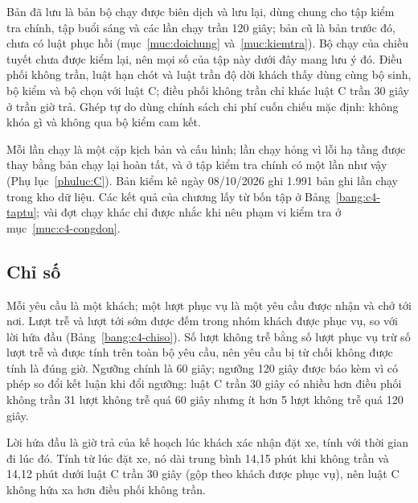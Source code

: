 Bản đã lưu là bản bộ chạy được biên dịch và lưu lại, dùng chung cho tập kiểm tra chính, tập buổi sáng và các lần
chạy trần 120 giây; bản cũ là bản trước đó, chưa có luật phục hồi (mục~\ref{muc:doichung} và~\ref{muc:kiemtra}). Bộ
chạy của chiều tuyết chưa được kiểm lại, nên mọi số của tập này dưới đây mang lưu ý đó. Điều phối không trần, luật
hạn chót và luật trần độ dời khách thấy dùng cùng bộ sinh, bộ kiểm và bộ chọn với luật C; điều phối không trần chỉ
khác luật C trần 30 giây ở trần giờ trả. Ghép tự do dùng chính sách chi phí cuốn chiếu mặc định: không khóa gì và
không qua bộ kiểm cam kết.

Mỗi lần chạy là một cặp kịch bản và cấu hình; lần chạy hỏng vì lỗi hạ tầng được thay bằng bản chạy lại hoàn tất,
và ở tập kiểm tra chính có một lần như vậy (Phụ lục~\ref{phuluc:C}). Bản kiểm kê ngày 08/10/2026 ghi 1.991 bản ghi
lần chạy trong kho dữ liệu. Các kết quả của chương lấy từ bốn tập ở Bảng~\ref{bang:c4-taptu}; vài đợt chạy khác chỉ
được nhắc khi nêu phạm vi kiểm tra ở mục~\ref{muc:c4-congdon}.

\subsection{Chỉ số}
\label{muc:c4-chiso}

Mỗi yêu cầu là một khách; một lượt phục vụ là một yêu cầu được nhận và chở tới nơi. Lượt trễ và lượt tới sớm được
đếm trong nhóm khách được phục vụ, so với lời hứa đầu (Bảng~\ref{bang:c4-chiso}). Số lượt không trễ bằng số lượt
phục vụ trừ số lượt trễ và được tính trên toàn bộ yêu cầu, nên yêu cầu bị từ chối không được tính là đúng giờ.
Ngưỡng chính là 60 giây; ngưỡng 120 giây được báo kèm vì có phép so đổi kết luận khi đổi ngưỡng: luật C trần 30
giây có nhiều hơn điều phối không trần 31 lượt không trễ quá 60 giây nhưng ít hơn 5 lượt không trễ quá 120 giây.

Lời hứa đầu là giờ trả của kế hoạch lúc khách xác nhận đặt xe, tính với thời gian đi lúc đó. Tính từ lúc đặt xe,
nó dài trung bình 14,15 phút khi không trần và 14,12 phút dưới luật C trần 30 giây (gộp theo khách được phục vụ),
nên luật C không hứa xa hơn điều phối không trần.

